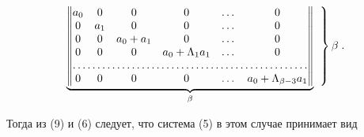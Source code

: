 \begin{equation} 


\underbrace{ 


\begin{Vmatrix} 


a_0 & 0 & 0 & 0 & \dots & 0 \\ 


0 & a_1 & 0 & 0 & \dots & 0 \\ 


0 & 0 & a_0+a_1 & 0 & \dots & 0 \\ 


0 & 0 & 0 & a_0+\Lambda_1a_1 & \dots & 0 \\ 


\hdotsfor{6} \\ 


0 & 0 & 0 & 0 & \dots & a_0+\Lambda_{\beta-3}a_1 


\end{Vmatrix} 


}_\beta 


\left.


\phantom{


\begin{matrix}


.\\


.\\


.\\


.\\


.\\


.


\end{matrix}


}


\right\}\beta\;. 


\end{equation} 


%


Тогда из (9) и (6) следует, что система (5) в этом случае принимает вид 


%


